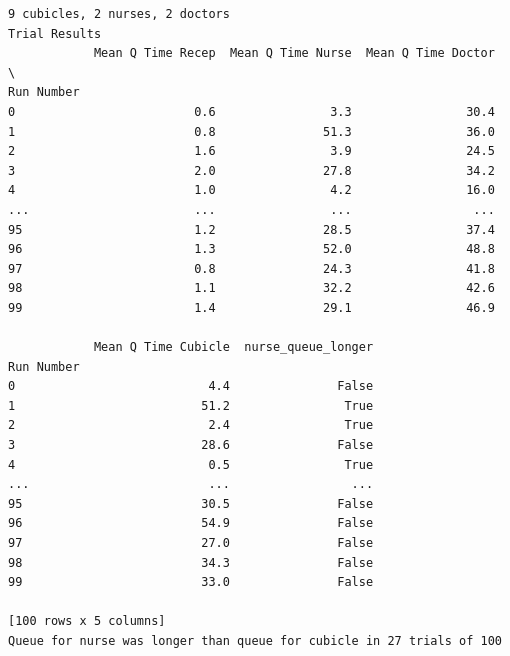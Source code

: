 \documentclass[
  letterpaper,
  DIV=11,
  numbers=noendperiod]{scrreprt}
\begin{document}
\begin{verbatim}
9 cubicles, 2 nurses, 2 doctors
Trial Results
            Mean Q Time Recep  Mean Q Time Nurse  Mean Q Time Doctor  \
Run Number                                                             
0                         0.6                3.3                30.4   
1                         0.8               51.3                36.0   
2                         1.6                3.9                24.5   
3                         2.0               27.8                34.2   
4                         1.0                4.2                16.0   
...                       ...                ...                 ...   
95                        1.2               28.5                37.4   
96                        1.3               52.0                48.8   
97                        0.8               24.3                41.8   
98                        1.1               32.2                42.6   
99                        1.4               29.1                46.9   

            Mean Q Time Cubicle  nurse_queue_longer  
Run Number                                           
0                           4.4               False  
1                          51.2                True  
2                           2.4                True  
3                          28.6               False  
4                           0.5                True  
...                         ...                 ...  
95                         30.5               False  
96                         54.9               False  
97                         27.0               False  
98                         34.3               False  
99                         33.0               False  

[100 rows x 5 columns]
Queue for nurse was longer than queue for cubicle in 27 trials of 100
\end{verbatim}
\end{document}
